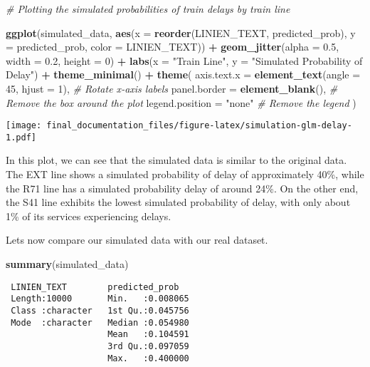 \documentclass[
]{article}
\newenvironment{Shaded}{\begin{snugshade}}{\end{snugshade}}
\newcommand{\AttributeTok}[1]{\textcolor[rgb]{0.13,0.29,0.53}{#1}}
\newcommand{\CommentTok}[1]{\textcolor[rgb]{0.56,0.35,0.01}{\textit{#1}}}
\newcommand{\DecValTok}[1]{\textcolor[rgb]{0.00,0.00,0.81}{#1}}
\newcommand{\FloatTok}[1]{\textcolor[rgb]{0.00,0.00,0.81}{#1}}
\newcommand{\FunctionTok}[1]{\textcolor[rgb]{0.13,0.29,0.53}{\textbf{#1}}}
\newcommand{\NormalTok}[1]{#1}
\newcommand{\SpecialCharTok}[1]{\textcolor[rgb]{0.81,0.36,0.00}{\textbf{#1}}}
\newcommand{\StringTok}[1]{\textcolor[rgb]{0.31,0.60,0.02}{#1}}
\begin{document}
\begin{Shaded}
\begin{Highlighting}[]
\CommentTok{\# Plotting the simulated probabilities of train delays by train line}

\FunctionTok{ggplot}\NormalTok{(simulated\_data, }\FunctionTok{aes}\NormalTok{(}\AttributeTok{x =} \FunctionTok{reorder}\NormalTok{(LINIEN\_TEXT, predicted\_prob), }\AttributeTok{y =}\NormalTok{ predicted\_prob, }\AttributeTok{color =}\NormalTok{ LINIEN\_TEXT)) }\SpecialCharTok{+}
  \FunctionTok{geom\_jitter}\NormalTok{(}\AttributeTok{alpha =} \FloatTok{0.5}\NormalTok{, }\AttributeTok{width =} \FloatTok{0.2}\NormalTok{, }\AttributeTok{height =} \DecValTok{0}\NormalTok{) }\SpecialCharTok{+}
  \FunctionTok{labs}\NormalTok{(}\AttributeTok{x =} \StringTok{"Train Line"}\NormalTok{, }\AttributeTok{y =} \StringTok{"Simulated Probability of Delay"}\NormalTok{) }\SpecialCharTok{+}
  \FunctionTok{theme\_minimal}\NormalTok{() }\SpecialCharTok{+}
  \FunctionTok{theme}\NormalTok{(}
    \AttributeTok{axis.text.x =} \FunctionTok{element\_text}\NormalTok{(}\AttributeTok{angle =} \DecValTok{45}\NormalTok{, }\AttributeTok{hjust =} \DecValTok{1}\NormalTok{), }\CommentTok{\# Rotate x{-}axis labels}
    \AttributeTok{panel.border =} \FunctionTok{element\_blank}\NormalTok{(), }\CommentTok{\# Remove the box around the plot}
    \AttributeTok{legend.position =} \StringTok{"none"} \CommentTok{\# Remove the legend}
\NormalTok{  )}
\end{Highlighting}
\end{Shaded}

\texttt{[image: final\_documentation\_files/figure-latex/simulation-glm-delay-1.pdf]}

In this plot, we can see that the simulated data is similar to the
original data. The EXT line shows a simulated probability of delay of
approximately 40\%, while the R71 line has a simulated probability delay
of around 24\%. On the other end, the S41 line exhibits the lowest
simulated probability of delay, with only about 1\% of its services
experiencing delays.

Lets now compare our simulated data with our real dataset.

\begin{Shaded}
\begin{Highlighting}[]
\FunctionTok{summary}\NormalTok{(simulated\_data)}
\end{Highlighting}
\end{Shaded}

\begin{verbatim}
 LINIEN_TEXT        predicted_prob    
 Length:10000       Min.   :0.008065  
 Class :character   1st Qu.:0.045756  
 Mode  :character   Median :0.054980  
                    Mean   :0.104591  
                    3rd Qu.:0.097059  
                    Max.   :0.400000  
\end{verbatim}
\end{document}
